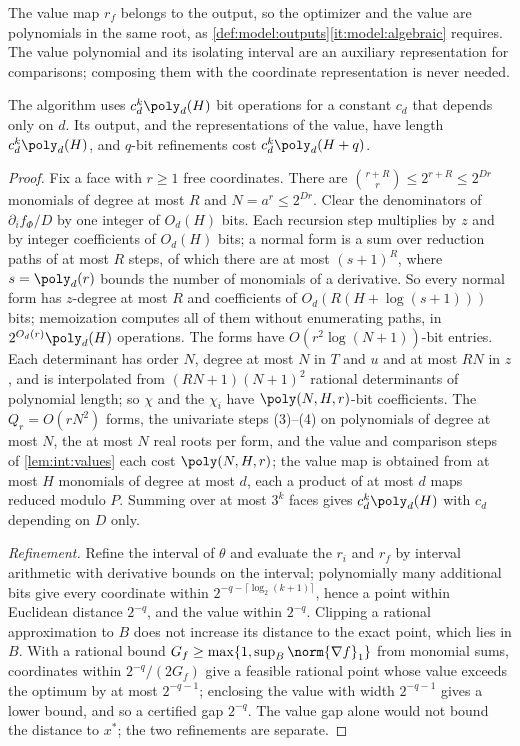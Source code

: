 The value map $r_f$ belongs to the output, so the optimizer and the value are
polynomials in the same root, as \cref{def:model:outputs}\ref{it:model:algebraic}
requires. The value polynomial and its isolating interval are an auxiliary
representation for comparisons; composing them with the coordinate
representation is never needed.

\begin{lemma}[Cost]\label{lem:int:cost}
The algorithm uses $c_d^k\poly_d(H)$ bit operations for a constant $c_d$ that
depends only on $d$. Its output, and the representations of the value, have
length $c_d^k\poly_d(H)$, and $q$-bit refinements cost $c_d^k\poly_d(H+q)$.
\end{lemma}

\begin{proof}
Fix a face with $r\ge1$ free coordinates. There are
$\binom{r+R}r\le2^{r+R}\le2^{Dr}$ monomials of degree at most $R$ and
$N=a^r\le2^{Dr}$. Clear the denominators of $\partial_if_\Phi/D$ by one integer of
$O_d(H)$ bits. Each recursion step multiplies by $z$ and by integer coefficients
of $O_d(H)$ bits; a normal form is a sum over reduction paths of at most $R$
steps, of which there are at most $(s+1)^R$, where $s=\poly_d(r)$ bounds the
number of monomials of a derivative. So every normal form has $z$-degree at most
$R$ and coefficients of $O_d(R(H+\log(s+1)))$ bits; memoization computes all of
them without enumerating paths, in $2^{O_d(r)}\poly_d(H)$ operations. The forms
have $O(r^2\log(N+1))$-bit entries. Each determinant has order $N$, degree at
most $N$ in $T$ and $u$ and at most $RN$ in $z$, and is interpolated from
$(RN+1)(N+1)^2$ rational determinants of polynomial length; so $\chi$ and the
$\chi_i$ have $\poly(N,H,r)$-bit coefficients. The $Q_r=O(rN^2)$ forms, the
univariate steps (3)--(4) on polynomials of degree at most $N$, the at most $N$
real roots per form, and the value and comparison steps of
\cref{lem:int:values} each cost $\poly(N,H,r)$; the value map is obtained from
at most $H$ monomials of degree at most $d$, each a product of at most $d$
maps reduced modulo $P$. Summing over at most $3^k$ faces gives
$c_d^k\poly_d(H)$ with $c_d$ depending on $D$ only.

\emph{Refinement.} Refine the interval of $\theta$ and evaluate the $r_i$ and
$r_f$ by interval arithmetic with derivative bounds on the interval;
polynomially many additional bits give every coordinate within
$2^{-q-\lceil\log_2(k+1)\rceil}$, hence a point within Euclidean distance
$2^{-q}$, and the value within $2^{-q}$. Clipping a rational approximation to
$B$ does not increase its distance to the exact point, which lies in $B$. With
a rational bound $G_f\ge\max\{1,\sup_B\norm{\nabla f}_1\}$ from monomial sums,
coordinates within $2^{-q}/(2G_f)$ give a feasible rational point whose value
exceeds the optimum by at most $2^{-q-1}$; enclosing the value with width
$2^{-q-1}$ gives a lower bound, and so a certified gap $2^{-q}$. The value
gap alone would not bound the distance to $x^*$; the two refinements are
separate.
\end{proof}

